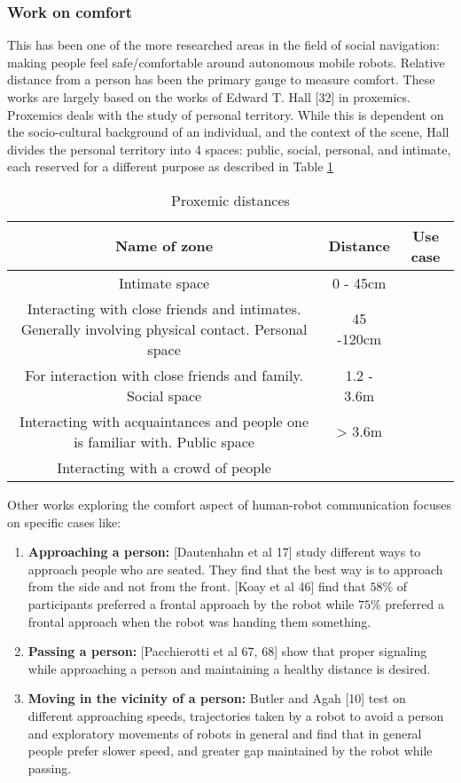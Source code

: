 \subsubsection{Work on comfort}
This has been one of the more researched areas in the field of social navigation: making people feel safe/comfortable around autonomous mobile robots. Relative distance from a person has been the primary gauge to measure comfort. These works are largely based on the works of Edward T. Hall [32] in proxemics. Proxemics deals with the study of personal territory. While this is dependent on the socio-cultural background of an individual, and the context of the scene, Hall divides the personal territory into 4 spaces: public, social, personal, and intimate, each reserved for a different purpose as described in Table \ref{tab:proxemics}
\begin{table}
    \label{tab:proxemics}
    \caption{Proxemic distances}
    \begin{center}
        \renewcommand{\arraystretch}{1.3}
        \begin{tabular}{|c|c|c|}
            \hline
            Name of zone & Distance & Use case \\
            \hline\hline
            Intimate space & 0 - 45cm & \\ Interacting with close friends and intimates. Generally involving physical contact.
            Personal space & 45 -120cm & \\  For interaction with close friends and family.
            Social space & 1.2 - 3.6m & \\ Interacting with acquaintances and people one is familiar with.
            Public space & > 3.6m & \\ Interacting with a crowd of people
            \hline
        \end{tabular}
    \end{center}
\end{table}
Other works exploring the comfort aspect of human-robot communication focuses on specific cases like:
\begin{enumerate}
    \item \textbf{Approaching a person:} [Dautenhahn et al 17] study different ways to approach people who are seated. They find that the best way is to approach from the side and not from the front.
    [Koay et al 46]  find that $58\%$ of participants preferred a frontal approach by the robot while $75\%$ preferred a frontal approach when the robot was handing them something.
    \item \textbf{Passing a person:} [Pacchierotti et al 67, 68] show that proper signaling while approaching a person and maintaining a healthy distance is desired.
    \item \textbf{Moving in the vicinity of a person:}  Butler and Agah [10] test on different approaching speeds, trajectories taken by a robot to avoid a person and exploratory movements of robots in general and find that in general people prefer slower speed, and greater gap maintained by the robot while passing.
\end{enumerate}

